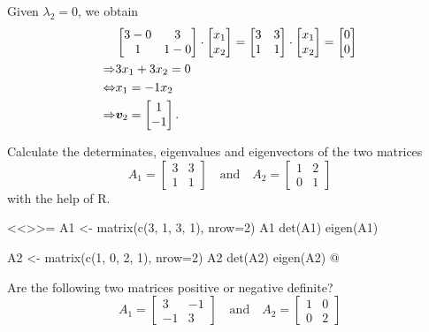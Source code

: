 \documentclass
[answers]
{exercise_sheet}
\begin{document}
\begin{Answer}{2}
Given $\lambda_2 = 0$, we obtain
\begin{align*}
&
\begin{bmatrix}
3-0 & 3 \\
1 & 1-0
\end{bmatrix}
\cdot 
\begin{bmatrix}
x_1 \\
x_2
\end{bmatrix}
=
\begin{bmatrix}
3 & 3 \\
1 & 1
\end{bmatrix}
\cdot 
\begin{bmatrix}
x_1 \\
x_2
\end{bmatrix}
=
\begin{bmatrix}
0 \\
0
\end{bmatrix}
\\
\Rightarrow & 3 x_1 + 3 x_2 = 0 \\
\Leftrightarrow & x_1 = -1 x_2 \\
\Rightarrow & \bm{v}_2 = \begin{bmatrix}
1 \\
-1
\end{bmatrix} 
.
\end{align*}
\end{Answer}\fi\makeatother

\begin{Question}{1}
Calculate the determinates, eigenvalues and eigenvectors of the two matrices
\begin{equation*}
A_1 =
\begin{bmatrix}
3 & 3 \\
1 & 1
\end{bmatrix}
\quad
\text{and}
\quad
A_2 = 
\begin{bmatrix}
1 & 2 \\
0 & 1
\end{bmatrix}
\end{equation*}
with the help of R.
\end{Question}

\makeatletter\if@answers\begin{Answer}{2}
<<>>=
A1 <- matrix(c(3, 1, 3, 1), nrow=2)
A1
det(A1)
eigen(A1)

A2 <- matrix(c(1, 0, 2, 1), nrow=2)
A2
det(A2)
eigen(A2)
@
\end{Answer}\fi\makeatother

\begin{Question}{1}
Are the following two matrices positive or negative definite?
\begin{equation*}
A_1 =
\begin{bmatrix}
3 & -1 \\
-1 & 3
\end{bmatrix}
\quad
\text{and}
\quad
A_2 = 
\begin{bmatrix}
1 & 0 \\
0 & 2
\end{bmatrix}
\end{equation*}
\end{Question}
\end{document}
